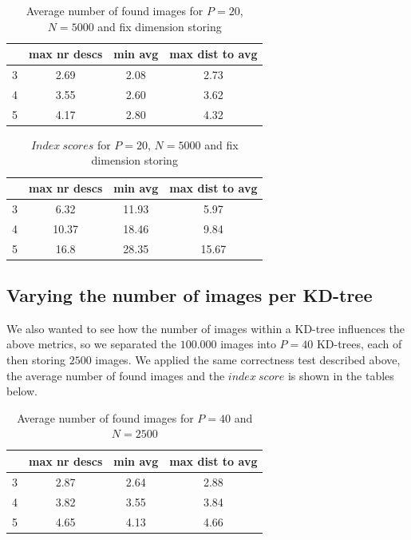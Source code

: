 \begin{table}[H]
\centering
\begin{tabular} {c | c | c | c}
	& max nr descs & min avg & max dist to avg \\
	\hline
	3 & 2.69 & 2.08 & 2.73 \\
	\hline
	4 & 3.55 & 2.60 & 3.62 \\
	\hline
	5 & 4.17 & 2.80 & 4.32 \\
\end{tabular}
\caption{Average number of found images for $P=20$, $N=5000$ and fix dimension storing}
\label{table:fixDimension1}
\end{table}

\begin{table}[H]
\centering
\begin{tabular} {c | c | c | c}
	& max nr descs & min avg & max dist to avg \\
	\hline
	3 & 6.32 & 11.93 & 5.97 \\
	\hline
	4 & 10.37 & 18.46 & 9.84 \\
	\hline
	5 & 16.8 & 28.35 & 15.67 \\
\end{tabular}
\caption{$Index\ scores$ for $P=20$, $N=5000$ and fix dimension storing}
\label{table:fixDimension2}
\end{table}

\subsection{Varying the number of images per KD-tree}

We also wanted to see how the number of images within a KD-tree influences the above metrics,
so we separated the $100.000$ images into $P=40$ KD-trees, each of then storing $2500$ images.
We applied the same correctness test described above, the average number of found images and the $index\ score$ is shown in the tables below.\\

\begin{table}[H]
\centering
\begin{tabular} {c | c | c | c}
	& max nr descs & min avg & max dist to avg \\
	\hline
	3 & 2.87 & 2.64 & 2.88 \\
	\hline
	4 & 3.82 & 3.55 & 3.84 \\
	\hline
	5 & 4.65 & 4.13 & 4.66 \\
\end{tabular}
\caption{Average number of found images for $P=40$ and $N=2500$}
\end{table}

